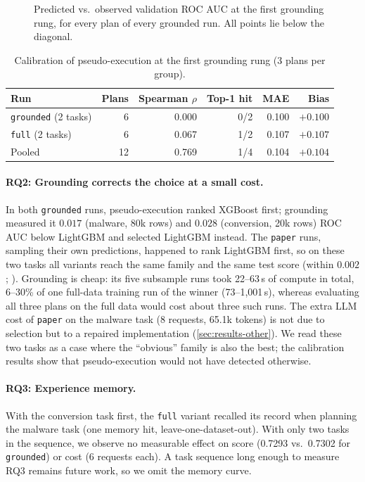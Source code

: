 \begin{figure}[t]
  \centering
  \caption{Predicted vs.\ observed validation ROC AUC at the first grounding rung, for every plan of every grounded run. All points lie below the diagonal.}
  \label{fig:calibration}
\end{figure}

\begin{table}[t]
  \centering
  \caption{Calibration of pseudo-execution at the first grounding rung (3 plans per group).}
  \label{tab:calibration}
  \small
  \begin{tabular}{lrrrrr}
    \toprule
    Run & Plans & Spearman $\rho$ & Top-1 hit & MAE & Bias \\
    \midrule
    \texttt{grounded} (2 tasks) & 6 & 0.000 & 0/2 & 0.100 & $+0.100$ \\
    \texttt{full} (2 tasks) & 6 & 0.067 & 1/2 & 0.107 & $+0.107$ \\
    Pooled & 12 & 0.769 & 1/4 & 0.104 & $+0.104$ \\
    \bottomrule
  \end{tabular}
\end{table}

\paragraph{RQ2: Grounding corrects the choice at a small cost.} In both \texttt{grounded} runs, pseudo-execution ranked XGBoost first; grounding measured it $0.017$ (malware, 80k rows) and $0.028$ (conversion, 20k rows) ROC AUC below LightGBM and selected LightGBM instead. The \texttt{paper} runs, sampling their own predictions, happened to rank LightGBM first, so on these two tasks all variants reach the same family and the same test score (within $0.002$; ). Grounding is cheap: its five subsample runs took 22--63\,s of compute in total, 6--30\% of one full-data training run of the winner (73--1{,}001\,s), whereas evaluating all three plans on the full data would cost about three such runs. The extra LLM cost of \texttt{paper} on the malware task (8 requests, 65.1k tokens) is not due to selection but to a repaired implementation (\cref{sec:results-other}). We read these two tasks as a case where the ``obvious'' family is also the best; the calibration results show that pseudo-execution would not have detected otherwise.

\paragraph{RQ3: Experience memory.} With the conversion task first, the \texttt{full} variant recalled its record when planning the malware task (one memory hit, leave-one-dataset-out). With only two tasks in the sequence, we observe no measurable effect on score (0.7293 vs.\ 0.7302 for \texttt{grounded}) or cost (6 requests each). A task sequence long enough to measure RQ3 remains future work, so we omit the memory curve.

